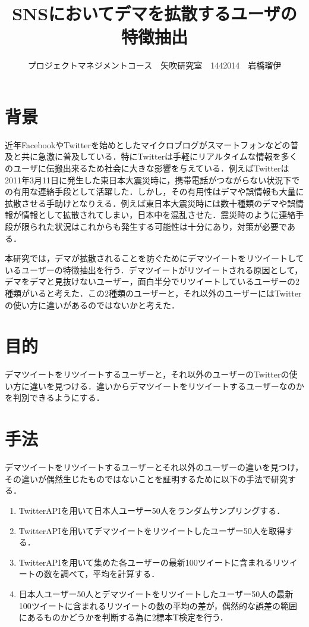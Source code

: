\documentclass[uplatex,twocolumn,dvipdfmx]{jsarticle}
\title{\vspace{-5mm}\fontsize{14pt}{0pt}\selectfont SNSにおいてデマを拡散するユーザの特徴抽出}
\author{\normalsize プロジェクトマネジメントコース　矢吹研究室　1442014　岩橋瑠伊}
\date{}
\begin{document}
\fontsize{10.5pt}{\baselineskip}\selectfont
\maketitle





\section{背景}
近年FacebookやTwitterを始めとしたマイクロブログがスマートフォンなどの普及と共に急激に普及している．特にTwitterは手軽にリアルタイムな情報を多くのユーザに伝搬出来るため社会に大きな影響を与えている．例えばTwitterは2011年3月11日に発生した東日本大震災時に，携帯電話がつながらない状況下での有用な連絡手段として活躍した．しかし，その有用性はデマや誤情報も大量に拡散させる手助けとなりえる．例えば東日本大震災時には数十種類のデマや誤情報が情報として拡散されてしまい，日本中を混乱させた．震災時のように連絡手段が限られた状況はこれからも発生する可能性は十分にあり，対策が必要である\cite{dema}．

本研究では，デマが拡散されることを防ぐためにデマツイートをリツイートしているユーザーの特徴抽出を行う．デマツイートがリツイートされる原因として，デマをデマと見抜けないユーザー，面白半分でリツイートしているユーザーの2種類がいると考えた．この2種類のユーザーと，それ以外のユーザーにはTwitterの使い方に違いがあるのではないかと考えた．

\section{目的}
デマツイートをリツイートするユーザーと，それ以外のユーザーのTwitterの使い方に違いを見つける．違いからデマツイートをリツイートするユーザーなのかを判別できるようにする．

\section{手法}
デマツイートをリツイートするユーザーとそれ以外のユーザーの違いを見つけ，その違いが偶然生じたものではないことを証明するために以下の手法で研究する．
\begin{enumerate}
\item TwitterAPIを用いて日本人ユーザー50人をランダムサンプリングする．
\item TwitterAPIを用いてデマツイートをリツイートしたユーザー50人を取得する．
\item TwitterAPIを用いて集めた各ユーザーの最新100ツイートに含まれるリツイートの数を調べて，平均を計算する．
\item 日本人ユーザー50人とデマツイートをリツイートしたユーザー50人の最新100ツイートに含まれるリツイートの数の平均の差が，偶然的な誤差の範囲にあるものかどうかを判断する為に2標本T検定を行う．
\end{enumerate}
\end{document}
